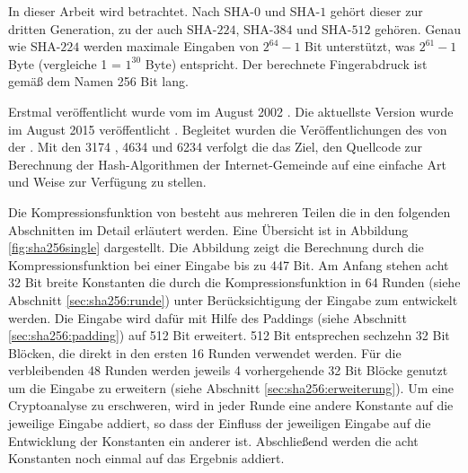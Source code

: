 In dieser Arbeit wird  betrachtet. Nach SHA-$0$ und SHA-$1$ gehört dieser zur dritten Generation, zu der auch SHA-$224$, SHA-$384$ und SHA-$512$ gehören.
Genau wie SHA-$224$ werden maximale Eingaben von $ 2^{64} - 1$ Bit unterstützt, was $ 2^{61} - 1 $ Byte (vergleiche 1  = $ 1^{30} $ Byte) entspricht.
Der berechnete Fingerabdruck ist gemäß dem Namen 256 Bit lang.

Erstmal veröffentlicht wurde  vom  im August 2002 \cite{nist1802}. Die aktuellste Version wurde im August 2015 veröffentlicht \cite{nist1804}.
Begleitet wurden die Veröffentlichungen des  von der . Mit den  3174 \cite{rfc3174}, 4634 \cite{rfc4634} und 6234 \cite{rfc6234}
verfolgt die  das Ziel, den Quellcode zur Berechnung der Hash-Algorithmen der Internet-Gemeinde auf eine einfache Art und Weise zur Verfügung zu stellen.

Die Kompressionsfunktion von  besteht aus mehreren Teilen die in den folgenden Abschnitten im Detail erläutert werden. Eine Übersicht ist in Abbildung
\ref{fig:sha256single} dargestellt. Die Abbildung zeigt die Berechnung durch die Kompressionsfunktion bei einer Eingabe bis zu 447 Bit. Am Anfang stehen acht
32 Bit breite Konstanten die durch die Kompressionsfunktion in 64 Runden (siehe Abschnitt \ref{sec:sha256:runde}) unter Berücksichtigung der Eingabe zum 
entwickelt werden. Die Eingabe wird dafür mit Hilfe des Paddings (siehe Abschnitt \ref{sec:sha256:padding}) auf 512 Bit erweitert. 512 Bit entsprechen sechzehn
32 Bit Blöcken, die direkt in den ersten 16 Runden verwendet werden. Für die verbleibenden 48 Runden werden jeweils 4 vorhergehende 32 Bit Blöcke genutzt um die
Eingabe zu erweitern (siehe Abschnitt \ref{sec:sha256:erweiterung}). Um eine Cryptoanalyse zu erschweren, wird in jeder Runde eine andere Konstante auf die
jeweilige Eingabe addiert, so dass der Einfluss der jeweiligen Eingabe auf die Entwicklung der Konstanten ein anderer ist. Abschließend werden die acht Konstanten
noch einmal auf das Ergebnis addiert.

